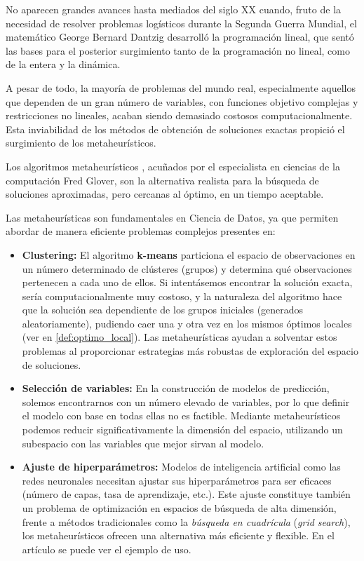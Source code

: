 \documentclass[12pt,a4paper]{book}
\begin{document}
No aparecen grandes avances hasta mediados del siglo XX cuando, fruto de la necesidad de resolver problemas logísticos durante la Segunda Guerra Mundial, el matemático George Bernard Dantzig \citep{Dantzig} desarrolló la programación lineal, que sentó las bases para el posterior surgimiento tanto de la programación no lineal, como de la entera y la dinámica.

A pesar de todo, la mayoría de problemas del mundo real, especialmente aquellos que dependen de un gran número de variables, con funciones objetivo complejas y restricciones no lineales, acaban siendo demasiado costosos computacionalmente. Esta inviabilidad de los métodos de obtención de soluciones exactas propició el surgimiento de los metaheurísticos.

Los algoritmos metaheurísticos \citep{metaheuristicos}, acuñados por el especialista en ciencias de la computación Fred Glover,
son la alternativa realista para la búsqueda de soluciones aproximadas, pero cercanas al óptimo, en un tiempo aceptable.

Las metaheurísticas son fundamentales en Ciencia de Datos, ya que permiten abordar de manera eficiente problemas complejos presentes en:

\begin{itemize}
    \item \textbf{Clustering:} El algoritmo \textbf{k-means} \citep{k-means} particiona el espacio de observaciones en un número determinado de clústeres (grupos) y determina qué observaciones pertenecen a cada uno de ellos. 
    Si intentásemos encontrar la solución exacta, sería computacionalmente muy costoso, y la naturaleza del algoritmo hace que la solución sea dependiente de los grupos iniciales (generados aleatoriamente), pudiendo caer una y otra vez en los mismos óptimos locales (ver en \ref{def:optimo_local}).
    Las metaheurísticas ayudan a solventar estos problemas al proporcionar estrategias más robustas de exploración del espacio de soluciones.
    
    \item \textbf{Selección de variables:} En la construcción de modelos de predicción, solemos encontrarnos con un número elevado de variables, por lo que definir el modelo con base en todas ellas no es factible. Mediante metaheurísticos podemos 
    reducir significativamente la dimensión del espacio, utilizando un subespacio con las variables que mejor sirvan al modelo.
    
    \item \textbf{Ajuste de hiperparámetros:} Modelos de inteligencia artificial como las redes neuronales necesitan ajustar sus hiperparámetros para ser eficaces (número de capas, tasa de aprendizaje, etc.). Este ajuste constituye también un problema de optimización en espacios de búsqueda de alta dimensión, frente a métodos tradicionales como la \textit{búsqueda en cuadrícula} (\textit{grid search}), los metaheurísticos ofrecen una alternativa más eficiente y flexible. En el artículo \cite{hyperparameters} se puede ver el ejemplo de uso.
\end{itemize}
\end{document}
